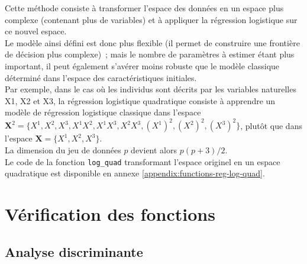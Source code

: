 \documentclass[a4paper,10pt]{report}
\begin{document}
Cette méthode consiste à transformer l'espace des données en un espace plus complexe (contenant plus de variables) et à appliquer la régression logistique sur ce nouvel espace.\\

Le modèle ainsi défini est donc plus flexible (il permet de construire une frontière de décision plus complexe)~; mais le nombre de paramètres à estimer étant plus important, il peut également s’avérer moins robuste que le modèle classique déterminé dans l’espace des caractéristiques initiales.\\

Par exemple, dans le cas où les individus sont décrits par les variables naturelles X1, X2 et X3, la régression logistique quadratique consiste à apprendre un modèle de régression logistique classique dans l’espace $\mathbf{X}^2 = \{X^1, X^2, X^3, X^1X^2, X^1X^3, X^2X^3, (X^1)^2, (X^2)^2, (X^3)^2\}$, plutôt que dans l’espace $\mathbf{X} = \{X^1, X^2, X^3\}$.\\

La dimension du jeu de données $p$ devient alors $p(p + 3)/2$.\\


Le code de la fonction \texttt{log\_quad} transformant l'espace originel en un espace quadratique est disponible en annexe \ref{appendix:functions-reg-log-quad}.







\section{Vérification des fonctions}


\subsection{Analyse discriminante}
\end{document}
